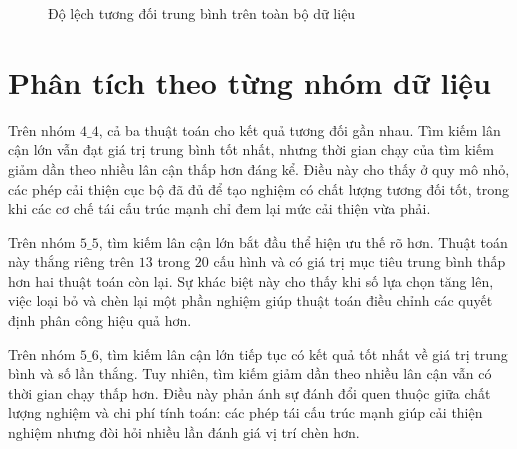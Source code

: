 \begin{figure}[H]
\centering
{}
\caption{Độ lệch tương đối trung bình trên toàn bộ dữ liệu}
\label{fig:chapter5-overall-gap}
\end{figure}

\section{Phân tích theo từng nhóm dữ liệu}

Trên nhóm $4\_4$, cả ba thuật toán cho kết quả tương đối gần nhau. Tìm kiếm lân cận lớn vẫn đạt giá trị trung bình tốt nhất, nhưng thời gian chạy của tìm kiếm giảm dần theo nhiều lân cận thấp hơn đáng kể. Điều này cho thấy ở quy mô nhỏ, các phép cải thiện cục bộ đã đủ để tạo nghiệm có chất lượng tương đối tốt, trong khi các cơ chế tái cấu trúc mạnh chỉ đem lại mức cải thiện vừa phải.

Trên nhóm $5\_5$, tìm kiếm lân cận lớn bắt đầu thể hiện ưu thế rõ hơn. Thuật toán này thắng riêng trên $13$ trong $20$ cấu hình và có giá trị mục tiêu trung bình thấp hơn hai thuật toán còn lại. Sự khác biệt này cho thấy khi số lựa chọn tăng lên, việc loại bỏ và chèn lại một phần nghiệm giúp thuật toán điều chỉnh các quyết định phân công hiệu quả hơn.

Trên nhóm $5\_6$, tìm kiếm lân cận lớn tiếp tục có kết quả tốt nhất về giá trị trung bình và số lần thắng. Tuy nhiên, tìm kiếm giảm dần theo nhiều lân cận vẫn có thời gian chạy thấp hơn. Điều này phản ánh sự đánh đổi quen thuộc giữa chất lượng nghiệm và chi phí tính toán: các phép tái cấu trúc mạnh giúp cải thiện nghiệm nhưng đòi hỏi nhiều lần đánh giá vị trí chèn hơn.

